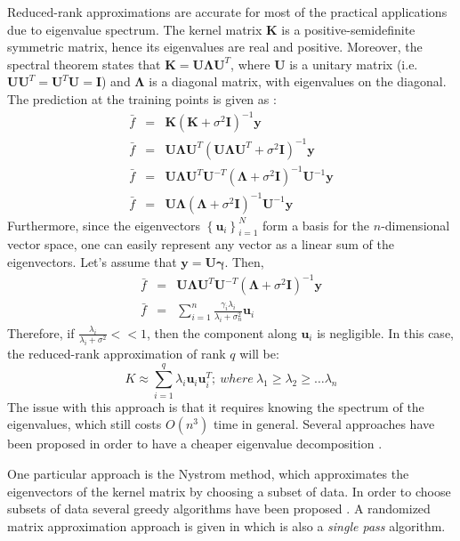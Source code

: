 \documentclass{article}
\begin{document}
Reduced-rank approximations are accurate for most of the practical applications due to eigenvalue spectrum. The kernel matrix $\mathbf{K}$ is a positive-semidefinite symmetric matrix, hence its eigenvalues are real and positive. Moreover, the spectral theorem states that $\mathbf{K}=\mathbf{U\Lambda U}^T$, where $\mathbf{U}$ is a unitary matrix (i.e. $\mathbf{U}\mathbf{U}^T=\mathbf{U}^T\mathbf{U}=\mathbf{I}$) and $\mathbf{\Lambda}$ is a diagonal matrix, with eigenvalues on the diagonal. The prediction at the training points is given as :
\begin{eqnarray}
\bar{f}&=&\mathbf{K}(\mathbf{K}+\sigma^2\mathbf{I})^{-1}\mathbf{y} \nonumber \\
\bar{f}&=&\mathbf{U\Lambda U}^T(\mathbf{U\Lambda U}^T+\sigma^2\mathbf{I})^{-1}\mathbf{y} \nonumber \\
\bar{f}&=& \mathbf{U\Lambda U}^T\mathbf{U}^{-T}(\mathbf{\Lambda}+\sigma^2\mathbf{I})^{-1}\mathbf{U}^{-1}\mathbf{y} \nonumber \\
\bar{f}&=& \mathbf{U\Lambda}(\mathbf{\Lambda}+\sigma^2\mathbf{I})^{-1}\mathbf{U}^{-1}\mathbf{y} 
\end{eqnarray}
Furthermore, since the eigenvectors $\left\{\mathbf{u}_i\right\}_{i=1}^N$ form a basis for the $n$-dimensional vector space, one can easily represent any vector as a linear sum of the eigenvectors. Let's assume that $\mathbf{y}=\mathbf{U}\mathbf{\gamma}$. Then,
\begin{eqnarray}
\bar{f}&=& \mathbf{U\Lambda U}^T\mathbf{U}^{-T}(\mathbf{\Lambda}+\sigma^2\mathbf{I})^{-1}\mathbf{y}  \nonumber \\
\bar{f}&=&\sum_{i=1}^n\frac{\gamma_i\lambda_i}{\lambda_i+\sigma_n^2}\mathbf{u}_i
\end{eqnarray}
Therefore, if $\frac{\lambda_i}{\lambda_i+\sigma^2}<<1$, then the component along $\mathbf{u}_i$ is negligible. In this case, the reduced-rank approximation of rank $q$ will be:
\begin{equation}
K\approx \sum_{i=1}^q \lambda_i \mathbf{u}_i \mathbf{u}_i^T; \> where \> \lambda_1\geq \lambda_2 \geq \dots \lambda_n
\end{equation}
The issue with this approach is that it requires knowing the spectrum of the eigenvalues, which still costs $O(n^3)$ time in general.  Several approaches have been proposed in order to have a cheaper eigenvalue decomposition \cite{rasmussen06}. 

One particular approach is the Nystrom method, which approximates the eigenvectors of the kernel matrix by choosing a subset of data. In order to choose subsets of data several greedy algorithms have been proposed \cite{rasmussen06} \cite{smolaGreedy}. A randomized matrix approximation approach is given in \cite{RandomizedMatrixDecompose} which is also a \textit{single pass} algorithm. 
\end{document}
